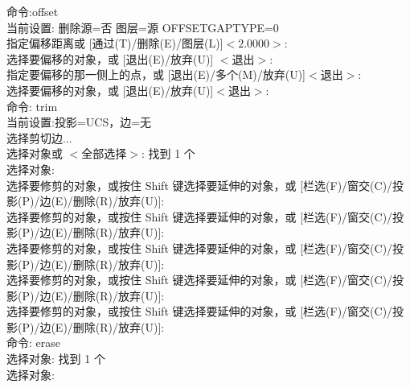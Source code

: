 命令:offset\\
当前设置: 删除源=否  图层=源  OFFSETGAPTYPE=0\\
指定偏移距离或 [通过(T)/删除(E)/图层(L)]$ <2.0000>$: \\
选择要偏移的对象，或 [退出(E)/放弃(U)] $<$退出$>$:\\
指定要偏移的那一侧上的点，或 [退出(E)/多个(M)/放弃(U)]$ <$退出$>$:\\
选择要偏移的对象，或 [退出(E)/放弃(U)]$ <$退出$>$:\\
命令: trim\\
当前设置:投影=UCS，边=无\\
选择剪切边...\\
选择对象或 $<$全部选择$>$:  找到 1 个\\
选择对象:\\
选择要修剪的对象，或按住 Shift 键选择要延伸的对象，或
[栏选(F)/窗交(C)/投影(P)/边(E)/删除(R)/放弃(U)]:\\
选择要修剪的对象，或按住 Shift 键选择要延伸的对象，或
[栏选(F)/窗交(C)/投影(P)/边(E)/删除(R)/放弃(U)]:\\
选择要修剪的对象，或按住 Shift 键选择要延伸的对象，或
[栏选(F)/窗交(C)/投影(P)/边(E)/删除(R)/放弃(U)]:\\
选择要修剪的对象，或按住 Shift 键选择要延伸的对象，或
[栏选(F)/窗交(C)/投影(P)/边(E)/删除(R)/放弃(U)]:\\
选择要修剪的对象，或按住 Shift 键选择要延伸的对象，或
[栏选(F)/窗交(C)/投影(P)/边(E)/删除(R)/放弃(U)]:\\
命令: erase\\
选择对象: 找到 1 个\\
选择对象:\\

